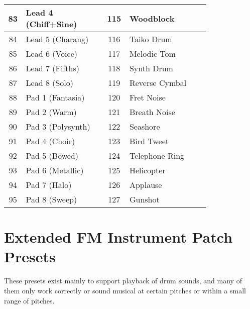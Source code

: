 \begin{tabular}{|c|p{0.4\linewidth}|c|p{0.4\linewidth}|}
	83  &  Lead 4 (Chiff+Sine) & 115  &  Woodblock \\ \hline
	84  &  Lead 5 (Charang) & 116  &  Taiko Drum \\ \hline
	85  &  Lead 6 (Voice) & 117  &  Melodic Tom \\ \hline
	86  &  Lead 7 (Fifths) & 118  &  Synth Drum \\ \hline
	87  &  Lead 8 (Solo) & 119  &  Reverse Cymbal \\ \hline
	88  &  Pad 1 (Fantasia) & 120  &  Fret Noise \\ \hline
	89  &  Pad 2 (Warm) & 121  &  Breath Noise \\ \hline
	90  &  Pad 3 (Polysynth) & 122  &  Seashore \\ \hline
	91  &  Pad 4 (Choir) & 123  &  Bird Tweet \\ \hline
	92  &  Pad 5 (Bowed) & 124  &  Telephone Ring \\ \hline
	93  &  Pad 6 (Metallic) & 125  &  Helicopter \\ \hline
	94  &  Pad 7 (Halo) & 126  &  Applause \\ \hline
	95  &  Pad 8 (Sweep) & 127  &  Gunshot \\ \hline
\end{tabular}

\clearpage

\section {Extended FM Instrument Patch Presets}

These presets exist mainly to support playback of drum sounds, and many of them
only work correctly or sound musical at certain pitches or within a small range
of pitches.\\

